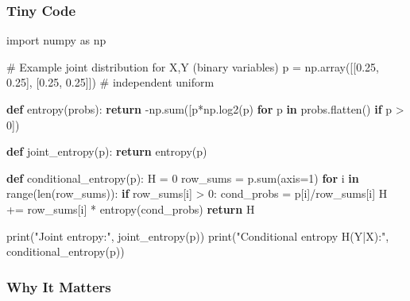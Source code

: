 \documentclass[
  letterpaper,
  DIV=11,
  numbers=noendperiod]{scrreprt}
\newenvironment{Shaded}{\begin{snugshade}}{\end{snugshade}}
\newcommand{\BuiltInTok}[1]{\textcolor[rgb]{0.00,0.23,0.31}{#1}}
\newcommand{\CommentTok}[1]{\textcolor[rgb]{0.37,0.37,0.37}{#1}}
\newcommand{\ControlFlowTok}[1]{\textcolor[rgb]{0.00,0.23,0.31}{\textbf{#1}}}
\newcommand{\DecValTok}[1]{\textcolor[rgb]{0.68,0.00,0.00}{#1}}
\newcommand{\FloatTok}[1]{\textcolor[rgb]{0.68,0.00,0.00}{#1}}
\newcommand{\ImportTok}[1]{\textcolor[rgb]{0.00,0.46,0.62}{#1}}
\newcommand{\KeywordTok}[1]{\textcolor[rgb]{0.00,0.23,0.31}{\textbf{#1}}}
\newcommand{\NormalTok}[1]{\textcolor[rgb]{0.00,0.23,0.31}{#1}}
\newcommand{\OperatorTok}[1]{\textcolor[rgb]{0.37,0.37,0.37}{#1}}
\newcommand{\StringTok}[1]{\textcolor[rgb]{0.13,0.47,0.30}{#1}}
\begin{document}
\subsubsection{Tiny Code}\label{tiny-code-161}

\begin{Shaded}
\begin{Highlighting}[]
\ImportTok{import}\NormalTok{ numpy }\ImportTok{as}\NormalTok{ np}

\CommentTok{\# Example joint distribution for X,Y (binary variables)}
\NormalTok{p }\OperatorTok{=}\NormalTok{ np.array([[}\FloatTok{0.25}\NormalTok{, }\FloatTok{0.25}\NormalTok{],}
\NormalTok{              [}\FloatTok{0.25}\NormalTok{, }\FloatTok{0.25}\NormalTok{]])  }\CommentTok{\# independent uniform}

\KeywordTok{def}\NormalTok{ entropy(probs):}
    \ControlFlowTok{return} \OperatorTok{{-}}\NormalTok{np.}\BuiltInTok{sum}\NormalTok{([p}\OperatorTok{*}\NormalTok{np.log2(p) }\ControlFlowTok{for}\NormalTok{ p }\KeywordTok{in}\NormalTok{ probs.flatten() }\ControlFlowTok{if}\NormalTok{ p }\OperatorTok{\textgreater{}} \DecValTok{0}\NormalTok{])}

\KeywordTok{def}\NormalTok{ joint\_entropy(p):}
    \ControlFlowTok{return}\NormalTok{ entropy(p)}

\KeywordTok{def}\NormalTok{ conditional\_entropy(p):}
\NormalTok{    H }\OperatorTok{=} \DecValTok{0}
\NormalTok{    row\_sums }\OperatorTok{=}\NormalTok{ p.}\BuiltInTok{sum}\NormalTok{(axis}\OperatorTok{=}\DecValTok{1}\NormalTok{)}
    \ControlFlowTok{for}\NormalTok{ i }\KeywordTok{in} \BuiltInTok{range}\NormalTok{(}\BuiltInTok{len}\NormalTok{(row\_sums)):}
        \ControlFlowTok{if}\NormalTok{ row\_sums[i] }\OperatorTok{\textgreater{}} \DecValTok{0}\NormalTok{:}
\NormalTok{            cond\_probs }\OperatorTok{=}\NormalTok{ p[i]}\OperatorTok{/}\NormalTok{row\_sums[i]}
\NormalTok{            H }\OperatorTok{+=}\NormalTok{ row\_sums[i] }\OperatorTok{*}\NormalTok{ entropy(cond\_probs)}
    \ControlFlowTok{return}\NormalTok{ H}

\BuiltInTok{print}\NormalTok{(}\StringTok{"Joint entropy:"}\NormalTok{, joint\_entropy(p))}
\BuiltInTok{print}\NormalTok{(}\StringTok{"Conditional entropy H(Y|X):"}\NormalTok{, conditional\_entropy(p))}
\end{Highlighting}
\end{Shaded}

\subsubsection{Why It Matters}\label{why-it-matters-59}
\end{document}
